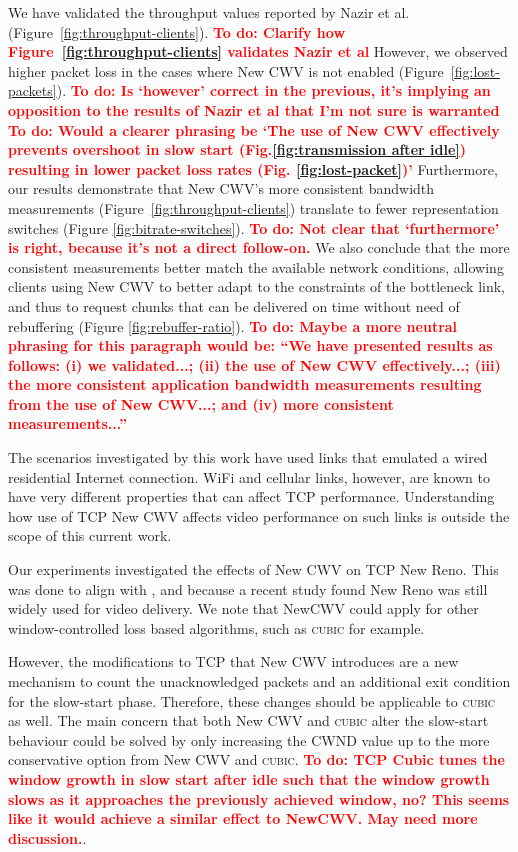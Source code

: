 \documentclass[10pt,sigconf]{acmart}
\newcommand{\todo}[1]{\textbf{\textcolor{red}{To do: #1}}}
\begin{document}
We have validated the throughput values reported by Nazir et al.~\cite{Nazir-2014-performance-evaluation-congestion-window-validation-dash-newcwv} (Figure~\ref{fig:throughput-clients}). 
\todo{Clarify how Figure~\ref{fig:throughput-clients} validates Nazir et al}
However, we observed higher packet loss in the cases where New CWV is not enabled (Figure~\ref{fig:lost-packets}). 
\todo{Is `however' correct in the previous, it's implying an opposition to the results of Nazir et al that I'm not sure is warranted}
\todo{Would a clearer phrasing be `The use of New CWV effectively prevents overshoot in slow start (Fig.\ref{fig:transmission after idle}) resulting in lower packet loss rates (Fig. \ref{fig:lost-packet})'}
Furthermore, our results demonstrate that New CWV's more consistent bandwidth measurements (Figure~\ref{fig:throughput-clients}) translate to fewer representation switches (Figure \ref{fig:bitrate-switches}). 
\todo{Not clear that `furthermore' is right, because it's not a direct follow-on.}
We also conclude that the more consistent measurements better match the available network conditions, allowing clients using New CWV to better adapt to the constraints of the bottleneck link, and thus to request chunks that can be delivered on time without need of rebuffering (Figure \ref{fig:rebuffer-ratio}).
\todo{Maybe a more neutral phrasing for this paragraph would be: ``We have presented results as follows: (i) we validated...; (ii) the use of New CWV effectively...; (iii) the more consistent application bandwidth measurements resulting from the use of New CWV...; and (iv) more consistent measurements...''}

The scenarios investigated by this work have used links that emulated a wired
residential Internet connection.  WiFi and cellular links, however, are known
to have very different properties that can affect TCP performance. Understanding
how use of TCP New CWV affects video performance on such links is outside the
scope of this current work.

Our experiments investigated the effects of New CWV on TCP New Reno. This was done to align with
\cite{Nazir-2014-performance-evaluation-congestion-window-validation-dash-newcwv},
and because a recent study \cite{Mishra-2019-the-great-internet-tcp-congestion-control-census}
found New Reno was still widely used for video delivery.
We note that NewCWV could apply for other window-controlled loss based
algorithms, such as \textsc{cubic} for example. 

 However, the modifications to TCP that New CWV introduces are a new mechanism to count the unacknowledged packets and an additional exit condition for the slow-start phase. Therefore, these changes should be applicable to \textsc{cubic} as well. The main concern that both New CWV and \textsc{cubic} alter the slow-start behaviour could be solved by only increasing the CWND value up to the more conservative option from New CWV and \textsc{cubic}.
\todo{TCP Cubic tunes the window growth in slow start after idle such that
the window growth slows as it approaches the previously achieved window,
no? This seems like it would achieve a similar effect to NewCWV. May need
more discussion.}.
\end{document}
